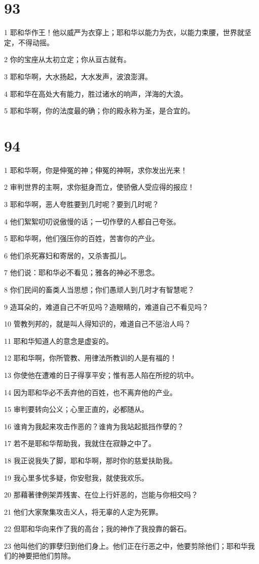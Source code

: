 \chapter{93}

\par 1 耶和华作王！他以威严为衣穿上；耶和华以能力为衣，以能力束腰，世界就坚定，不得动摇。
\par 2 你的宝座从太初立定；你从亘古就有。
\par 3 耶和华啊，大水扬起，大水发声，波浪澎湃。
\par 4 耶和华在高处大有能力，胜过诸水的响声，洋海的大浪。
\par 5 耶和华啊，你的法度最的确；你的殿永称为圣，是合宜的。

\chapter{94}

\par 1 耶和华啊，你是伸冤的神；伸冤的神啊，求你发出光来！
\par 2 审判世界的主啊，求你挺身而立，使骄傲人受应得的报应！
\par 3 耶和华啊，恶人夸胜要到几时呢？要到几时呢？
\par 4 他们絮絮叨叨说傲慢的话；一切作孽的人都自己夸张。
\par 5 耶和华啊，他们强压你的百姓，苦害你的产业。
\par 6 他们杀死寡妇和寄居的，又杀害孤儿。
\par 7 他们说：耶和华必不看见；雅各的神必不思念。
\par 8 你们民间的畜类人当思想；你们愚顽人到几时才有智慧呢？
\par 9 造耳朵的，难道自己不听见吗？造眼睛的，难道自己不看见吗？
\par 10 管教列邦的，就是叫人得知识的，难道自己不惩治人吗？
\par 11 耶和华知道人的意念是虚妄的。
\par 12 耶和华啊，你所管教、用律法所教训的人是有福的！
\par 13 你使他在遭难的日子得享平安；惟有恶人陷在所挖的坑中。
\par 14 因为耶和华必不丢弃他的百姓，也不离弃他的产业。
\par 15 审判要转向公义；心里正直的，必都随从。
\par 16 谁肯为我起来攻击作恶的？谁肯为我站起抵挡作孽的？
\par 17 若不是耶和华帮助我，我就住在寂静之中了。
\par 18 我正说我失了脚，耶和华啊，那时你的慈爱扶助我。
\par 19 我心里多忧多疑，你安慰我，就使我欢乐。
\par 20 那藉著律例架弄残害、在位上行奸恶的，岂能与你相交吗？
\par 21 他们大家聚集攻击义人，将无辜的人定为死罪。
\par 22 但耶和华向来作了我的高台；我的神作了我投靠的磐石。
\par 23 他叫他们的罪孽归到他们身上。他们正在行恶之中，他要剪除他们；耶和华我们的神要把他们剪除。

